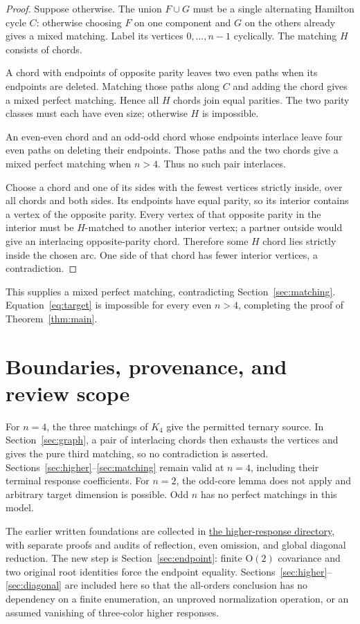\documentclass[11pt]{article}
\numberwithin{equation}{section}
\begin{document}
\begin{proof}
Suppose otherwise. The union \(F\cup G\) must be a single alternating
Hamilton cycle \(C\): otherwise choosing \(F\) on one component and \(G\)
on the others already gives a mixed matching. Label its vertices
\(0,\ldots,n-1\) cyclically. The matching \(H\) consists of chords.

A chord with endpoints of opposite parity leaves two even paths when its
endpoints are deleted. Matching those paths along \(C\) and adding the chord
gives a mixed perfect matching. Hence all \(H\) chords join equal parities.
The two parity classes must each have even size; otherwise \(H\) is impossible.

An even-even chord and an odd-odd chord whose endpoints interlace leave four
even paths on deleting their endpoints. Those paths and the two chords give
a mixed perfect matching when \(n>4\). Thus no such pair interlaces.

Choose a chord and one of its sides with the fewest vertices strictly inside,
over all chords and both sides. Its endpoints have equal parity, so its
interior contains a vertex of the opposite parity. Every vertex of that
opposite parity in the interior must be \(H\)-matched to another interior
vertex; a partner outside would give an interlacing opposite-parity chord.
Therefore some \(H\) chord lies strictly inside the chosen arc. One side of
that chord has fewer interior vertices, a contradiction.
\end{proof}

This supplies a mixed perfect matching, contradicting Section~\ref{sec:matching}.
Equation~\eqref{eq:target} is impossible for every even \(n>4\), completing
the proof of Theorem~\ref{thm:main}.

\section{Boundaries, provenance, and review scope}\label{sec:scope}

For \(n=4\), the three matchings of \(K_4\) give the permitted ternary
source. In Section~\ref{sec:graph}, a pair of interlacing chords then exhausts
the vertices and gives the pure third matching, so no contradiction is asserted.
Sections~\ref{sec:higher}--\ref{sec:matching} remain valid at \(n=4\), including
their terminal response coefficients. For \(n=2\), the odd-core lemma does not
apply and arbitrary target dimension is possible. Odd \(n\) has no perfect
matchings in this model.

The earlier written foundations are collected in
\href{../computations/unaudited-codex-higher-common-power-bridge-2026-09-05/UNIFORM-THREE-ACTIVE-COLOR-HIGHER-PURE-RESPONSE-VANISHING.md}{the higher-response directory},
with separate proofs and audits of reflection, even omission, and global
diagonal reduction. The new step is Section~\ref{sec:endpoint}: finite
\(\mathrm O(2)\) covariance and two original root identities force the
endpoint equality. Sections~\ref{sec:higher}--\ref{sec:diagonal} are included
here so that the all-orders conclusion has no dependency on a finite
enumeration, an unproved normalization operation, or an assumed vanishing
of three-color higher responses.
\end{document}
